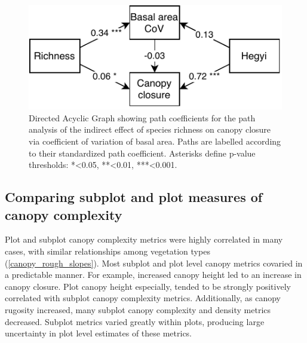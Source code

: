 \documentclass[11pt,a4paper]{article}
\begin{document}
\begin{figure}
	\includegraphics[width=0.8\linewidth]{path_diag}
	\caption{Directed Acyclic Graph showing path coefficients for the path analysis of the indirect effect of species richness on canopy closure via coefficient of variation of basal area. Paths are labelled according to their standardized path coefficient. Asterisks define p-value thresholds: *<0.05, **<0.01, ***<0.001.}
	\label{path_diag}
\end{figure}



\subsection{Comparing subplot and plot measures of canopy complexity}

Plot and subplot canopy complexity metrics were highly correlated in many cases, with similar relationships among vegetation types (\autoref{canopy_rough_slopes}). Most subplot and plot level canopy metrics covaried in a predictable manner. For example, increased canopy height led to an increase in canopy closure. Plot canopy height especially, tended to be strongly positively correlated with subplot canopy complexity metrics. Additionally, as canopy rugosity increased, many subplot canopy complexity and density metrics decreased. Subplot metrics varied greatly within plots, producing large uncertainty in plot level estimates of these metrics. 
\end{document}
